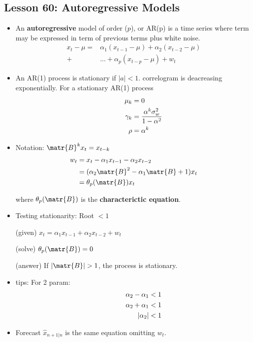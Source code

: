 \documentclass[10pt, french]{article}
\begin{document}
\begin{multicols*}{3}
\section*{Lesson 60: Autoregressive Models}
\begin{itemize}[align=left,leftmargin=*]
    \item An \textbf{autoregressive} model of order ($p$), or AR(p) is a time series where term may be expressed in term of previous terms plus white noise.
    \begin{align*}
    x_t - \mu =& \alpha_1(x_{t-1} - \mu) + \alpha_2(x_{t-2} - \mu) \\
    +& ...  + \alpha_p(x_{t-p} - \mu) + w_t
    \end{align*}
    \item An AR(1) process is stationary if $|a|<1$. correlogram is deacreasing exponentially. For a stationary AR(1) process \\
    \begin{align*}
    \hspace*{1cm}
      \mu_k &= 0 \\
      \gamma_k &= \frac{\alpha^k \sigma_w^2}{1 - \alpha^2} \\
      \rho &= \alpha^k
    \end{align*}
    \item Notation: $\matr{B}^kx_t = x_{t-k}$
    \begin{align*}
        w_t &= x_t - \alpha_1 x_{t-1} - \alpha_2 x_{t-2}\\
        &= (\alpha_2\matr{B}^2 - \alpha_1\matr{B} + 1)x_t \\
        &= \theta_p(\matr{B})x_t
    \end{align*}
    \item[] where $\theta_p(\matr{B})$ is the \textbf{characterictic equation}.
    \item Testing stationarity: Root $< 1$
    \item[(given)] $x_t = \alpha_1 x_{t-1} + \alpha_2 x_{t-2} + w_t$
    \item[(solve)] $\theta_p(\matr{B}) = 0$
    \item[(answer)] If $|\matr{B}| > 1$, the process is stationary.
    \item tips: For 2 param:
    \begin{align*}
        \hspace*{1cm}
       \alpha_2 - \alpha_1 < 1 \\
       \alpha_2 + \alpha_1 < 1 \\
       |\alpha_2| < 1
    \end{align*}
    \item Forecast $\hat{x}_{n+1|n}$ is the same equation omitting $w_t$.
\end{itemize}


\end{multicols*}
\end{document}
